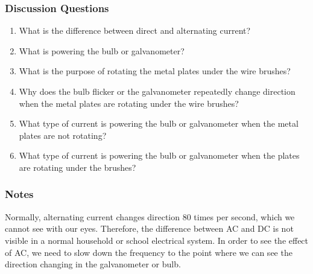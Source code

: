 \subsubsection*{Discussion Questions}
\begin{enumerate}
\item{What is the difference between direct and alternating current?}
\item{What is powering the bulb or galvanometer?}
\item{What is the purpose of rotating the metal plates under the wire brushes?}
\item{Why does the bulb flicker or the galvanometer repeatedly change direction when the metal plates are rotating under the wire brushes?}
\item{What type of current is powering the bulb or galvanometer when the metal plates are not rotating?}
\item{What type of current is powering the bulb or galvanometer when the plates are rotating under the brushes?}
\end{enumerate}

\subsubsection*{Notes}
Normally, alternating current changes direction 80 times per second, which we cannot see with our eyes. Therefore, the difference between AC and DC is not visible in a normal household or school electrical system. In order to see the effect of AC, we need to slow down the frequency to the point where we can see the direction changing in the galvanometer or bulb.
